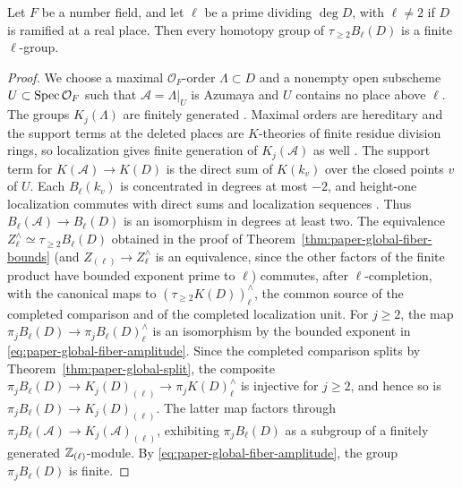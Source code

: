 \begin{corollary}\label{cor:paper-global-fiber-finite}
Let $F$ be a number field, and let $\ell$ be a prime dividing $\deg D$, with $\ell\ne2$ if $D$ is ramified at a real place.
Then every homotopy group of $\tau_{\ge2}B_\ell(D)$ is a finite $\ell$-group.
\end{corollary}
\begin{proof}
We choose a maximal $\mathcal O_F$-order $\Lambda\subset D$ and a nonempty open subscheme $U\subset\operatorname{Spec}\mathcal O_F$ such that $\mathcal A=\Lambda|_U$ is Azumaya and $U$ contains no place above $\ell$.
The groups $K_j(\Lambda)$ are finitely generated \cite{Kuku1982}.
Maximal orders are hereditary and the support terms at the deleted places are $K$-theories of finite residue division rings, so localization gives finite generation of $K_j(\mathcal A)$ as well \cite[Section 5]{QuillenHigher}.
The support term for $K(\mathcal A)\to K(D)$ is the direct sum of $K(k_v)$ over the closed points $v$ of $U$.
Each $B_\ell(k_v)$ is concentrated in degrees at most $-2$, and height-one localization commutes with direct sums and localization sequences \cite{QuillenFinite,ClausenMathew}.
Thus $B_\ell(\mathcal A)\to B_\ell(D)$ is an isomorphism in degrees at least two.
The equivalence $Z^\wedge_\ell\simeq\tau_{\ge2}B_\ell(D)$ obtained in the proof of Theorem~\ref{thm:paper-global-fiber-bounds} (and $Z_{(\ell)}\to Z^\wedge_\ell$ is an equivalence, since the other factors of the finite product have bounded exponent prime to $\ell$) commutes, after $\ell$-completion, with the canonical maps to $(\tau_{\ge2}K(D))^\wedge_\ell$, the common source of the completed comparison and of the completed localization unit.
For $j\ge2$, the map $\pi_jB_\ell(D)\to\pi_jB_\ell(D)^\wedge_\ell$ is an isomorphism by the bounded exponent in \eqref{eq:paper-global-fiber-amplitude}.
Since the completed comparison splits by Theorem~\ref{thm:paper-global-split}, the composite $\pi_jB_\ell(D)\to K_j(D)_{(\ell)}\to\pi_jK(D)^\wedge_\ell$ is injective for $j\ge2$, and hence so is $\pi_jB_\ell(D)\to K_j(D)_{(\ell)}$.
The latter map factors through $\pi_jB_\ell(\mathcal A)\to K_j(\mathcal A)_{(\ell)}$, exhibiting $\pi_jB_\ell(D)$ as a subgroup of a finitely generated $\mathbb Z_{(\ell)}$-module.
By \eqref{eq:paper-global-fiber-amplitude}, the group $\pi_jB_\ell(D)$ is finite.
\end{proof}

